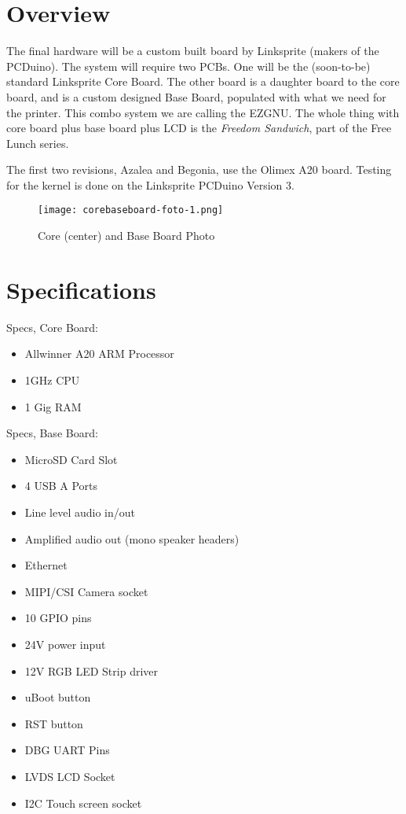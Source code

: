 %
%
%
%
%

\section{Overview}
The final hardware will be a custom built board by Linksprite (makers of the
PCDuino). The system will require two PCBs. One will be the (soon-to-be)
standard Linksprite Core Board. The other board is a daughter board to the
core board, and is a custom designed Base Board, populated with what we need
for the printer. This combo system we are calling the EZGNU. The whole thing
with core board plus base board plus LCD is the \emph{Freedom Sandwich}, part
of the Free Lunch series.

The first two revisions, Azalea and Begonia, use the Olimex A20 board. Testing
for the kernel is done on the Linksprite PCDuino Version 3.

\begin{figure}[H]
\centering
\texttt{[image: corebaseboard-foto-1.png]}
\caption{Core (center) and Base Board Photo}
\label{fig:bbfoto}
\end{figure}


\section{Specifications}
Specs, Core Board:

\begin{itemize}
  \item{Allwinner A20 ARM Processor}
  \item{1GHz CPU}
  \item{1 Gig RAM}
\end{itemize}

Specs, Base Board:
\begin{itemize}
  \item{MicroSD Card Slot}
  \item{4 USB A Ports}
  \item{Line level audio in/out}
  \item{Amplified audio out (mono speaker headers)}
  \item{Ethernet}
  \item{MIPI/CSI Camera socket}
  \item{10 GPIO pins}
  \item{24V power input}
  \item{12V RGB LED Strip driver}
  \item{uBoot button}
  \item{RST button}
  \item{DBG UART Pins}
  \item{LVDS LCD Socket}
  \item{I2C Touch screen socket}
\end{itemize}

